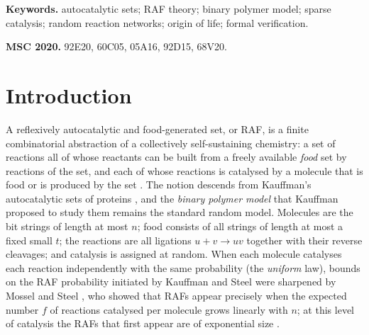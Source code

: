 \documentclass[11pt,a4paper]{article}
\theoremstyle{plain}
\theoremstyle{definition}
\theoremstyle{remark}
\begin{document}
\noindent\textbf{Keywords.} autocatalytic sets; RAF theory; binary polymer model; sparse catalysis; random reaction networks; origin of life; formal verification.

\medskip
\noindent\textbf{MSC 2020.} 92E20, 60C05, 05A16, 92D15, 68V20.

\section{Introduction}\label{sec:intro}

A reflexively autocatalytic and food-generated set, or RAF, is a finite combinatorial abstraction of a collectively self-sustaining chemistry: a set of reactions all of whose reactants can be built from a freely available \emph{food} set by reactions of the set, and each of whose reactions is catalysed by a molecule that is food or is produced by the set \cite{hordijk2004detecting,steel2019autocatalytic}. The notion descends from Kauffman's autocatalytic sets of proteins \cite{kauffman1986autocatalytic,kauffman1993origins}, and the \emph{binary polymer model} that Kauffman proposed to study them remains the standard random model. Molecules are the bit strings of length at most $n$; food consists of all strings of length at most a fixed small $t$; the reactions are all ligations $u+v\to uv$ together with their reverse cleavages; and catalysis is assigned at random. When each molecule catalyses each reaction independently with the same probability (the \emph{uniform} law), bounds on the RAF probability initiated by Kauffman and Steel \cite{kauffman1986autocatalytic,steel2000emergence} were sharpened by Mossel and Steel \cite{mossel2005random}, who showed that RAFs appear precisely when the expected number $f$ of reactions catalysed per molecule grows linearly with $n$; at this level of catalysis the RAFs that first appear are of exponential size \cite{hordijk2011required,hordijk2016variable}.
\end{document}
